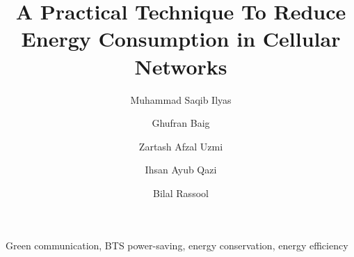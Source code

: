 \documentclass[preprint,12pt]{elsarticle}
\begin{document}
\begin{frontmatter}



\title{A Practical Technique To Reduce Energy Consumption in Cellular Networks}


\author[LUMS]{Muhammad Saqib Ilyas}
\author[LUMS]{Ghufran Baig}
\author[LUMS]{Zartash Afzal Uzmi}
\author[LUMS]{Ihsan Ayub Qazi}
\author[WaridTel]{Bilal Rassool}
\address[LUMS]{School of Science and Engineering, LUMS, Lahore, Pakistan}
\address[WaridTel]{Warid Telecom, Lahore, Pakistan}




\begin{keyword}

Green communication, BTS power-saving, energy conservation, energy efficiency
\end{keyword}

\end{frontmatter}








\end{document}
